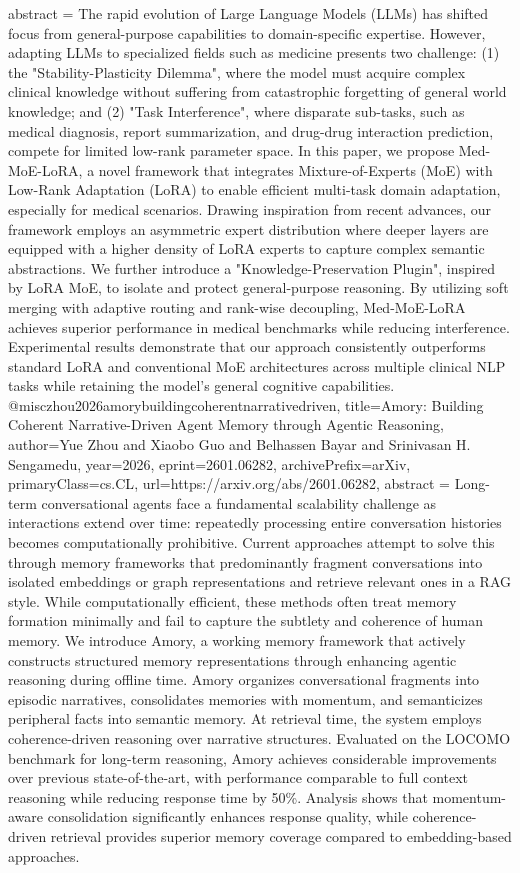 {      abstract = {The rapid evolution of Large Language Models (LLMs) has shifted focus from general-purpose capabilities to domain-specific expertise. However, adapting LLMs to specialized fields such as medicine presents two challenge: (1) the "Stability-Plasticity Dilemma", where the model must acquire complex clinical knowledge without suffering from catastrophic forgetting of general world knowledge; and (2) "Task Interference", where disparate sub-tasks, such as medical diagnosis, report summarization, and drug-drug interaction prediction, compete for limited low-rank parameter space. In this paper, we propose Med-MoE-LoRA, a novel framework that integrates Mixture-of-Experts (MoE) with Low-Rank Adaptation (LoRA) to enable efficient multi-task domain adaptation, especially for medical scenarios. Drawing inspiration from recent advances, our framework employs an asymmetric expert distribution where deeper layers are equipped with a higher density of LoRA experts to capture complex semantic abstractions. We further introduce a "Knowledge-Preservation Plugin", inspired by LoRA MoE, to isolate and protect general-purpose reasoning. By utilizing soft merging with adaptive routing and rank-wise decoupling, Med-MoE-LoRA achieves superior performance in medical benchmarks while reducing interference. Experimental results demonstrate that our approach consistently outperforms standard LoRA and conventional MoE architectures across multiple clinical NLP tasks while retaining the model's general cognitive capabilities.}
}@misc{zhou2026amorybuildingcoherentnarrativedriven,
      title={Amory: Building Coherent Narrative-Driven Agent Memory through Agentic Reasoning}, 
      author={Yue Zhou and Xiaobo Guo and Belhassen Bayar and Srinivasan H. Sengamedu},
      year={2026},
      eprint={2601.06282},
      archivePrefix={arXiv},
      primaryClass={cs.CL},
      url={https://arxiv.org/abs/2601.06282},
      abstract = {Long-term conversational agents face a fundamental scalability challenge as interactions extend over time: repeatedly processing entire conversation histories becomes computationally prohibitive. Current approaches attempt to solve this through memory frameworks that predominantly fragment conversations into isolated embeddings or graph representations and retrieve relevant ones in a RAG style. While computationally efficient, these methods often treat memory formation minimally and fail to capture the subtlety and coherence of human memory. We introduce Amory, a working memory framework that actively constructs structured memory representations through enhancing agentic reasoning during offline time. Amory organizes conversational fragments into episodic narratives, consolidates memories with momentum, and semanticizes peripheral facts into semantic memory. At retrieval time, the system employs coherence-driven reasoning over narrative structures. Evaluated on the LOCOMO benchmark for long-term reasoning, Amory achieves considerable improvements over previous state-of-the-art, with performance comparable to full context reasoning while reducing response time by 50\%. Analysis shows that momentum-aware consolidation significantly enhances response quality, while coherence-driven retrieval provides superior memory coverage compared to embedding-based approaches.}
}
